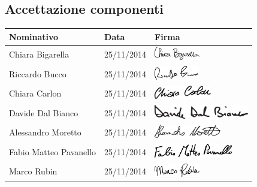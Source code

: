 \subsection{Accettazione componenti}
	\begin{center}
	\begin{tabu} to \textwidth {|X[4]|X[2c]|X[5]|}
	\hline
     Nominativo & Data & Firma \\ \hline
     Chiara Bigarella & 25/11/2014 & \includegraphics[height=6mm]{Commons/Pics/Signatures/Bigarella.pdf}  \\ \hline
     Riccardo Bucco & 25/11/2014 & \includegraphics[height=6mm]{Commons/Pics/Signatures/Bucco.pdf}\\ \hline
     Chiara Carlon & 25/11/2014 & \includegraphics[height=6mm]{Commons/Pics/Signatures/Carlon.pdf}\\ \hline
     Davide Dal Bianco & 25/11/2014 &\includegraphics[height=6mm]{Commons/Pics/Signatures/DalBianco.pdf} \\ \hline
     Alessandro Moretto & 25/11/2014 &\includegraphics[height=6mm]{Commons/Pics/Signatures/Moretto.pdf} \\ \hline
     Fabio Matteo Pavanello & 25/11/2014 & \includegraphics[height=6mm]{Commons/Pics/Signatures/Pavanello.pdf}\\ \hline
     Marco Rubin & 25/11/2014 & \includegraphics[height=6mm]{Commons/Pics/Signatures/Rubin.pdf} \\ \hline
     \end{tabu}
	\end{center}

